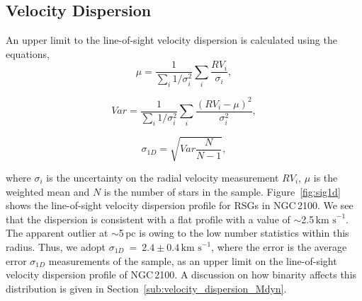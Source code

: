 \documentclass[useAMS,usenatbib]{mn2e}
\def\kms{$\mbox{km s}^{-1}$}
\begin{document}
\subsection{Velocity Dispersion} %
\label{sub:velocity_dispersion}

An upper limit to the line-of-sight velocity dispersion is calculated using the equations,
\begin{equation}
  \mu = \frac{1}{\sum_{i} 1/\sigma_{i}^{2}} \sum_{i} \frac{RV_{i}}{\sigma_{i}},
\end{equation}

\begin{equation}
Var = \frac{1}{\sum_{i}1/\sigma_{i}^{2}} \sum_{i}\frac{(RV_{i} - \mu)^{2}}{\sigma_{i}^{2}},
\end{equation}

\begin{equation}
  \sigma_{1D} = \sqrt{Var \frac{N}{N - 1}},
\end{equation}

\noindent where $\sigma_{i}$ is the uncertainty on the radial velocity measurement $RV_{i}$, $\mu$ is the weighted mean and $N$ is the number of stars in the sample.
Figure~\ref{fig:sig1d} shows the line-of-sight velocity dispersion profile for RSGs in NGC\,2100.
We see that the dispersion is consistent with a flat profile with a value of $\sim$2.5\,\kms.
The apparent outlier at $\sim$5\,pc is owing to the low number statistics within this radius.
Thus, we adopt $\sigma_{1D}~=~2.4\pm0.4\,$\kms, where the error is the average error $\sigma_{1D}$ measurements of the sample, as an upper limit on the line-of-sight velocity dispersion profile of NGC\,2100.
A discussion on how binarity affects this distribution is given in Section~\ref{sub:velocity_dispersion_Mdyn}.

\end{document}
